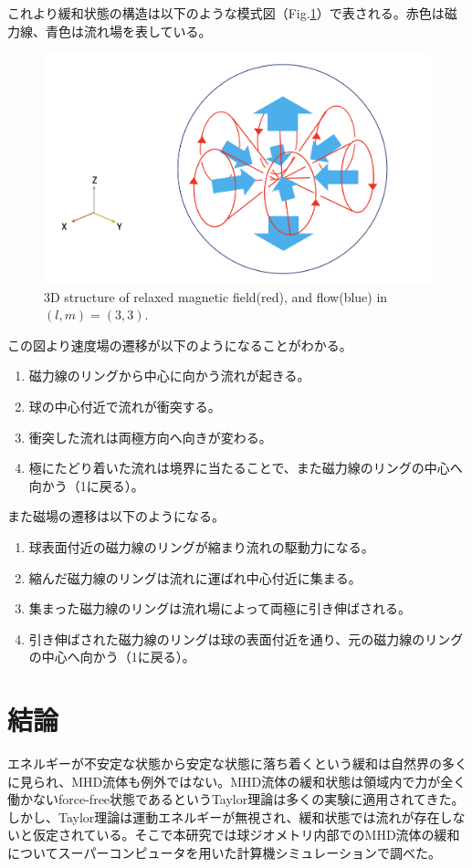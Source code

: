 \documentclass[12pt]{jsarticle}
\begin{document}
これより緩和状態の構造は以下のような模式図（Fig.\ref{L3M3_cartoon}）で表される。赤色は磁力線、青色は流れ場を表している。

\begin{figure}[H]
\centering
\includegraphics[height=0.5\textheight,width=1.0\hsize,angle=0,keepaspectratio]{./Image/relaxedL3M3_cartoon.png}
\caption{3D structure of relaxed magnetic field(red), and flow(blue) in $(l,m)=(3,3)$.}\label{L3M3_cartoon}
\end{figure}
\noindent
この図より速度場の遷移が以下のようになることがわかる。
\begin{enumerate}
\item 磁力線のリングから中心に向かう流れが起きる。
\item 球の中心付近で流れが衝突する。
\item 衝突した流れは両極方向へ向きが変わる。
\item 極にたどり着いた流れは境界に当たることで、また磁力線のリングの中心へ向かう（1に戻る）。
\end{enumerate}
また磁場の遷移は以下のようになる。
\begin{enumerate}
\item 球表面付近の磁力線のリングが縮まり流れの駆動力になる。
\item 縮んだ磁力線のリングは流れに運ばれ中心付近に集まる。
\item 集まった磁力線のリングは流れ場によって両極に引き伸ばされる。
\item 引き伸ばされた磁力線のリングは球の表面付近を通り、元の磁力線のリングの中心へ向かう（1に戻る）。
\end{enumerate}


\section{結論}
エネルギーが不安定な状態から安定な状態に落ち着くという緩和は自然界の多くに見られ、MHD流体も例外ではない。MHD流体の緩和状態は領域内で力が全く働かないforce-free状態であるというTaylor理論は多くの実験に適用されてきた。しかし、Taylor理論は運動エネルギーが無視され、緩和状態では流れが存在しないと仮定されている。そこで本研究では球ジオメトリ内部でのMHD流体の緩和についてスーパーコンピュータを用いた計算機シミュレーションで調べた。
\end{document}
